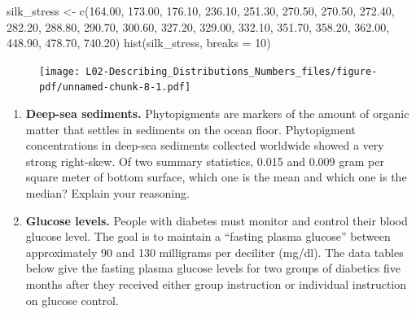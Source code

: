 \documentclass[
  letterpaper,
  DIV=11,
  numbers=noendperiod,
  oneside]{scrreprt}
\newenvironment{Shaded}{\begin{snugshade}}{\end{snugshade}}
\newcommand{\AttributeTok}[1]{\textcolor[rgb]{0.40,0.45,0.13}{#1}}
\newcommand{\DecValTok}[1]{\textcolor[rgb]{0.68,0.00,0.00}{#1}}
\newcommand{\FloatTok}[1]{\textcolor[rgb]{0.68,0.00,0.00}{#1}}
\newcommand{\FunctionTok}[1]{\textcolor[rgb]{0.28,0.35,0.67}{#1}}
\newcommand{\NormalTok}[1]{\textcolor[rgb]{0.00,0.23,0.31}{#1}}
\newcommand{\OtherTok}[1]{\textcolor[rgb]{0.00,0.23,0.31}{#1}}
\begin{document}
\begin{Shaded}
\begin{Highlighting}[]
\NormalTok{silk\_stress }\OtherTok{\textless{}{-}} \FunctionTok{c}\NormalTok{(}\FloatTok{164.00}\NormalTok{, }\FloatTok{173.00}\NormalTok{, }\FloatTok{176.10}\NormalTok{, }\FloatTok{236.10}\NormalTok{, }\FloatTok{251.30}\NormalTok{, }\FloatTok{270.50}\NormalTok{, }\FloatTok{270.50}\NormalTok{,}
    \FloatTok{272.40}\NormalTok{, }\FloatTok{282.20}\NormalTok{, }\FloatTok{288.80}\NormalTok{, }\FloatTok{290.70}\NormalTok{, }\FloatTok{300.60}\NormalTok{, }\FloatTok{327.20}\NormalTok{, }\FloatTok{329.00}\NormalTok{,}
    \FloatTok{332.10}\NormalTok{, }\FloatTok{351.70}\NormalTok{, }\FloatTok{358.20}\NormalTok{, }\FloatTok{362.00}\NormalTok{, }\FloatTok{448.90}\NormalTok{, }\FloatTok{478.70}\NormalTok{, }\FloatTok{740.20}\NormalTok{)}
\FunctionTok{hist}\NormalTok{(silk\_stress, }\AttributeTok{breaks =} \DecValTok{10}\NormalTok{)}
\end{Highlighting}
\end{Shaded}

\begin{figure}[H]

{\centering \texttt{[image: L02-Describing\_Distributions\_Numbers\_files/figure-pdf/unnamed-chunk-8-1.pdf]}

}

\end{figure}

\begin{enumerate}
\def\labelenumi{\arabic{enumi}.}
\setcounter{enumi}{1}
\item
  \textbf{Deep-sea sediments.} Phytopigments are markers of the amount
  of organic matter that settles in sediments on the ocean floor.
  Phytopigment concentrations in deep-sea sediments collected worldwide
  showed a very strong right-skew. Of two summary statistics, 0.015 and
  0.009 gram per square meter of bottom surface, which one is the mean
  and which one is the median? Explain your reasoning.
\item
  \textbf{Glucose levels.} People with diabetes must monitor and control
  their blood glucose level. The goal is to maintain a ``fasting plasma
  glucose'' between approximately 90 and 130 milligrams per deciliter
  (mg/dl). The data tables below give the fasting plasma glucose levels
  for two groups of diabetics five months after they received either
  group instruction or individual instruction on glucose control.
\end{enumerate}
\end{document}
